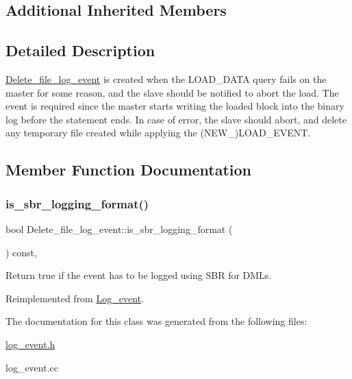 \subsection*{Additional Inherited Members}


\subsection{Detailed Description}
\mbox{\hyperlink{classDelete__file__log__event}{Delete\+\_\+file\+\_\+log\+\_\+event}} is created when the L\+O\+A\+D\+\_\+\+D\+A\+TA query fails on the master for some reason, and the slave should be notified to abort the load. The event is required since the master starts writing the loaded block into the binary log before the statement ends. In case of error, the slave should abort, and delete any temporary file created while applying the (N\+E\+W\+\_\+)L\+O\+A\+D\+\_\+\+E\+V\+E\+NT. 

\subsection{Member Function Documentation}
\mbox{\label{classDelete__file__log__event_a3cba2bd9057ac18a7ac720bbfeb2081f}} 
\subsubsection{\texorpdfstring{is\+\_\+sbr\+\_\+logging\+\_\+format()}{is\_sbr\_logging\_format()}}
{\footnotesize\ttfamily bool Delete\+\_\+file\+\_\+log\+\_\+event\+::is\+\_\+sbr\+\_\+logging\+\_\+format (\begin{DoxyParamCaption}{ }\end{DoxyParamCaption}) const\hspace{0.3cm}{\ttfamily [inline]}, {\ttfamily [virtual]}}

Return true if the event has to be logged using S\+BR for D\+M\+Ls. 

Reimplemented from \mbox{\hyperlink{classLog__event_ad4d689d007b7c8f1b0d54e65d8f34069}{Log\+\_\+event}}.



The documentation for this class was generated from the following files\+:\begin{DoxyCompactItemize}
\item 
\mbox{\hyperlink{log__event_8h}{log\+\_\+event.\+h}}\item 
log\+\_\+event.\+cc\end{DoxyCompactItemize}
